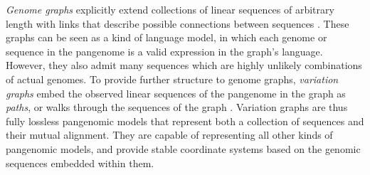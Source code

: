 \emph{Genome graphs} explicitly extend collections of linear sequences of arbitrary length with links that describe possible connections between sequences \cite{Paten_2017}.
These graphs can be seen as a kind of language model, in which each genome or sequence in the pangenome is a valid expression in the graph's language.
However, they also admit many sequences which are highly unlikely combinations of actual genomes.
To provide further structure to genome graphs, \emph{variation graphs} embed the observed linear sequences of the pangenome in the graph as \emph{paths}, or walks through the sequences of the graph \cite{Garrison_2018}.
Variation graphs are thus fully lossless pangenomic models that represent both a collection of sequences and their mutual alignment.
They are capable of representing all other kinds of pangenomic models, and provide stable coordinate systems based on the genomic sequences embedded within them.





